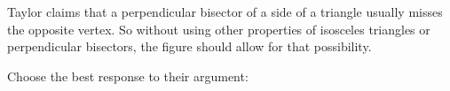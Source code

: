 \documentclass[nooutcomes]{ximera}
\begin{document}
\begin{problem}
Taylor claims that a perpendicular bisector of a side of a triangle usually misses the opposite vertex.  So without using other properties of isosceles triangles or perpendicular bisectors, the figure should allow for that possibility.  


Choose the best response to their argument: 
\begin{multipleChoice}
\end{multipleChoice} 
\end{problem}
\end{document}
